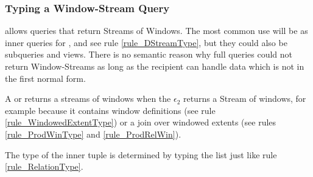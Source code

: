 \subsubsection{Typing a Window-Stream Query}
\SNEEql allows queries that return Streams of Windows.
The most common use will be as inner queries for ,  and  see rule \ref{rule_DStreamType}, but they could also be subqueries and views.
There is no semantic reason why full queries could not return Window-Streams as long as the recipient can handle data which is not in the first normal form.

A  or  returns a streams of windows when the  $\epsilon_2$ returns a Stream of windows, for example because it contains window definitions (see rule \ref{rule_WindowedExtentType}) or a join over windowed extents (see rules \ref{rule_ProdWinType} and \ref{rule_ProdRelWin}).

The type of the inner tuple is determined by typing the  list just like rule \ref{rule_RelationType}.



